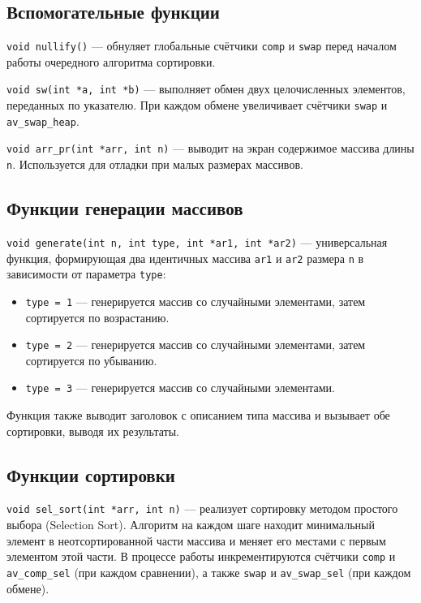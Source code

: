 \documentclass[a4paper,12pt,titlepage,finall]{article}
\begin{document}
\subsection{Вспомогательные функции}

\texttt{void nullify()} — обнуляет глобальные счётчики \texttt{comp} и \texttt{swap} перед началом работы очередного алгоритма сортировки.

\texttt{void sw(int *a, int *b)} — выполняет обмен двух целочисленных элементов, переданных по указателю. При каждом обмене увеличивает счётчики \texttt{swap} и \texttt{av\_swap\_heap}.

\texttt{void arr\_pr(int *arr, int n)} — выводит на экран содержимое массива длины \texttt{n}. Используется для отладки при малых размерах массивов.

\subsection{Функции генерации массивов}

\texttt{void generate(int n, int type, int *ar1, int *ar2)} — универсальная функция, формирующая два идентичных массива \texttt{ar1} и \texttt{ar2} размера \texttt{n} в зависимости от параметра \texttt{type}:
\begin{itemize}
    \item \texttt{type = 1} — генерируется массив со случайными элементами, затем сортируется по возрастанию.
    \item \texttt{type = 2} — генерируется массив со случайными элементами, затем сортируется по убыванию.
    \item \texttt{type = 3} — генерируется массив со случайными элементами.
\end{itemize}
Функция также выводит заголовок с описанием типа массива и вызывает обе сортировки, выводя их результаты.

\subsection{Функции сортировки}

\texttt{void sel\_sort(int *arr, int n)} — реализует сортировку методом простого выбора (Selection Sort). Алгоритм на каждом шаге находит минимальный элемент в неотсортированной части массива и меняет его местами с первым элементом этой части. В процессе работы инкрементируются счётчики \texttt{comp} и \texttt{av\_comp\_sel} (при каждом сравнении), а также \texttt{swap} и \texttt{av\_swap\_sel} (при каждом обмене).
\end{document}
